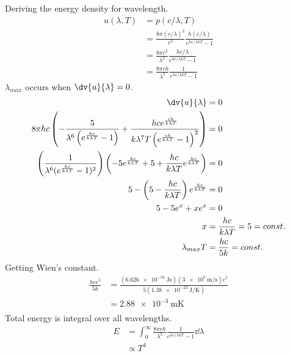 \documentclass{homework}
\begin{document}
\maketitle

\question
Deriving the energy density for wavelength.
\begin{align*}
    u(\lambda, T)	&=  p(c/\lambda, T)	\\
    &=  \frac{8\pi(c/\lambda)^2}{c^3} \frac{h(c/\lambda)}{e^{hc/\lambda kT}-1}	\\
    &=  \frac{8\pi c^2}{\lambda^2} \frac{hc/\lambda}{e^{hc/\lambda kT}-1}	\\
    &=  \frac{8\pi ch}{\lambda^5} \frac{1}{e^{hc/\lambda kT}-1}
\end{align*}
$\lambda_{max}$ occurs when $\dv{u}{\lambda} = 0$.
\begin{align*}
    \dv{u}{\lambda}	&=	0	\\
    8\pi hc \left(-\frac{5}{\lambda^6\left(e^{\frac{hc}{k\lambda T}}-1\right)}+\frac{hc e^{\frac{ch}{k\lambda T}}}{k\lambda^7T\left(e^{\frac{ch}{k\lambda T}}-1\right)^2}\right)   &=  0   \\
    \left(\frac{1}{\lambda^6 (e^{\frac{hc}{k\lambda T}}-1)^2}\right)\left(-5e^{\frac{hc}{k\lambda T}}+5+\frac{hc}{k\lambda T}e^{\frac{hc}{k\lambda T}}\right)   &=  0   \\
    5-\left(5-\frac{hc}{k\lambda T}\right)e^{\frac{hc}{k\lambda T}}   &=  0    \\
    5-5e^x+xe^x    &=   0	\\
    x   &=  \frac{hc}{k\lambda T}   = 5 = const.    \\
    \lambda_{max} T   &=  \frac{hc}{5k}    =	const.	\\
\end{align*}
Getting Wien's constant.
\begin{align*}
    \frac{hce^5}{5k}	&=	\frac{(\SI{6.626e-34}{\joule\second})(\SI{3e8}{\metre/\second})e^5}{5(\SI{1.38e-23}{\joule/\kelvin})}	\\
    &=	\SI{2.88e-3}{\metre\kelvin}	\\
\end{align*}
Total energy is integral over all wavelengths.
\begin{align*}
    E   &=  \int_0^\infty \frac{8\pi ch}{\lambda^5} \frac{1}{e^{hc/\lambda kT}-1} \dd{\lambda}	\\
        &\propto    T^4	\\
\end{align*}
\end{document}
